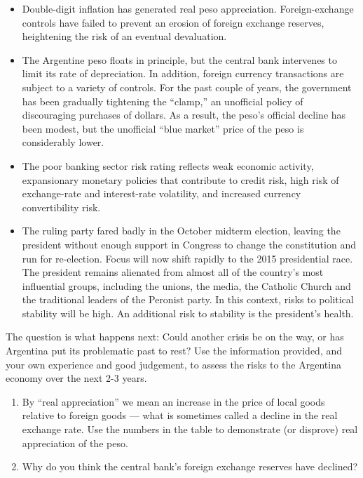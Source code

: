 \begin{enumerate}
\begin{itemize}
\item Double-digit inflation has generated real peso appreciation.
Foreign-exchange controls have failed to prevent an erosion of
foreign exchange reserves,
heightening the risk of an eventual devaluation.

\item The Argentine peso floats in principle, but the central bank intervenes to limit
its rate of depreciation.
In addition, foreign currency transactions are subject to a variety of controls.
For the past couple of years, the government has
been gradually tightening the ``clamp,''
an unofficial policy of discouraging purchases of dollars.
As a result, the peso's official decline has been modest,
but the unofficial ``blue market'' price of the peso is considerably lower.

\item The poor banking sector risk rating reflects weak economic activity, expansionary
monetary policies that contribute to credit risk, high risk of exchange-rate
and interest-rate volatility, and increased currency convertibility risk.

\item The ruling party fared badly in the October midterm election,
 leaving the president without enough support in Congress
 to change the constitution and run for re-election.
 Focus will now shift rapidly to the 2015 presidential race.
 The president remains alienated from almost all of the country's most influential groups,
including the unions, the media, the Catholic Church and the traditional
leaders of the Peronist party. In this context, risks to political stability will be
high. An additional risk to stability is the president's health.
\end{itemize}
%
The question is what happens next:  Could another crisis be on the way,
or has Argentina put its problematic past to rest?
Use the information provided, 
and your own experience and good judgement,
to assess the risks to the Argentina economy over the next 2-3 years.
%
\begin{enumerate}
\item By ``real appreciation'' we mean an increase in the price
of local goods relative to foreign goods ---
what is sometimes called a decline in the real exchange rate.
Use the numbers in the table to demonstrate (or disprove) real appreciation
of the peso.

\item Why do you think the central bank's foreign exchange reserves have declined?


\end{enumerate}
\end{enumerate}
